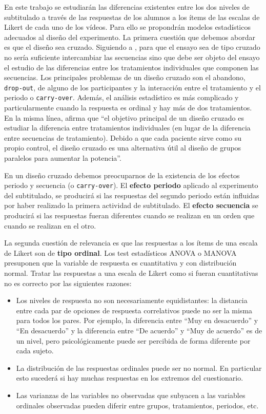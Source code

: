\documentclass[
  12pt,
  a4paper,
  extrafontsizes,
  onecolumn,
  openright]{memoir}
\begin{document}
En este trabajo se estudiarán las diferencias existentes entre los dos
niveles de subtitulado a través de las respuestas de los alumnos a los
ítems de las escalas de Likert de cada uno de los vídeos. Para ello se
propondrán modelos estadísticos adecuados al diseño del experimento. La
primera cuestión que debemos abordar es que el diseño sea cruzado.
Siguiendo a \textcite{senn2022}, para que el ensayo sea de tipo cruzado
no sería suficiente intercambiar las secuencias sino que debe ser objeto
del ensayo el estudio de las diferencias entre los tratamientos
individuales que componen las secuencias. Los principales problemas de
un diseño cruzado son el abandono, \texttt{drop-out}, de alguno de los
participantes y la interacción entre el tratamiento y el periodo o
\texttt{carry-over}. Además, el análisis estadístico es más complicado y
particularmente cuando la respuesta es ordinal y hay más de dos
tratamientos. En la misma línea, \textcite{lui2016} afirma que
\enquote{el objetivo principal de un diseño cruzado es estudiar la
diferencia entre tratamientos individuales (en lugar de la diferencia
entre secuencias de tratamiento). Debido a que cada paciente sirve como
su propio control, el diseño cruzado es una alternativa útil al diseño
de grupos paralelos para aumentar la potencia}.

En un diseño cruzado debemos preocuparnos de la existencia de los
efectos periodo y secuencia (o \texttt{carry-over}). El \textbf{efecto
periodo} aplicado al experimento del subtitulado, se producirá si las
respuestas del segundo periodo están influidas por haber realizado la
primera actividad de subtitulado. El \textbf{efecto secuencia} se
producirá si las respuestas fueran diferentes cuando se realizan en un
orden que cuando se realizan en el otro.

La segunda cuestión de relevancia es que las respuestas a los ítems de
una escala de Likert son de \textbf{tipo ordinal}. Los test estadísticos
ANOVA o MANOVA presuponen que la variable de respuesta es cuantitativa y
con distribución normal. Tratar las respuestas a una escala de Likert
como si fueran cuantitativas no es correcto por las siguientes razones:

\begin{itemize}
\item
  Los niveles de respuesta no son necesariamente equidistantes: la
  distancia entre cada par de opciones de respuesta correlativos puede
  no ser la misma para todos los pares. Por ejemplo, la diferencia entre
  \enquote{Muy en desacuerdo} y \enquote{En desacuerdo} y la diferencia
  entre \enquote{De acuerdo} y \enquote{Muy de acuerdo} es de un nivel,
  pero psicológicamente puede ser percibida de forma diferente por cada
  sujeto.
\item
  La distribución de las respuestas ordinales puede ser no normal. En
  particular esto sucederá si hay muchas respuestas en los extremos del
  cuestionario.
\item
  Las varianzas de las variables no observadas que subyacen a las
  variables ordinales observadas pueden diferir entre grupos,
  tratamientos, periodos, etc.
\end{itemize}
\end{document}
